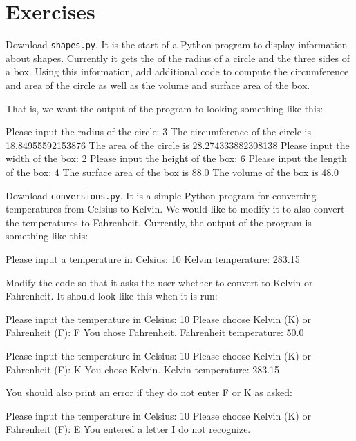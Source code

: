 \documentclass[11pt]{cselabheader}
\begin{document}
\pagebreak
\section{Exercises}

\begin{ex}[shapes.py] Download \texttt{shapes.py}. It is the start of a Python
  program to display information about shapes. Currently it gets the of the
  radius of a circle and the three sides of a box. Using this information, add
  additional code to compute the circumference and area of the circle as well as
  the volume and surface area of the box.

  That is, we want the output of the program to looking something like this:

  \begin{verbatimcode}
Please input the radius of the circle: 3
The circumference of the circle is 18.84955592153876
The area of the circle is 28.274333882308138
Please input the width of the box: 2
Please input the height of the box: 6
Please input the length of the box: 4
The surface area of the box is 88.0
The volume of the box is 48.0
  \end{verbatimcode}
\end{ex}

\begin{ex}[conversions.py] Download \texttt{conversions.py}. It is a simple
  Python program for converting temperatures from Celsius to Kelvin. We would
  like to modify it to also convert the temperatures to Fahrenheit. Currently,
  the output of the program is something like this:

  \begin{verbatimcode}
Please input a temperature in Celsius: 10
Kelvin temperature: 283.15
  \end{verbatimcode}

  Modify the code so that it asks the user whether to convert to Kelvin or
  Fahrenheit. It should look like this when it is run:

    \begin{verbatimcode}
Please input the temperature in Celsius: 10
Please choose Kelvin (K) or Fahrenheit (F): F
You chose Fahrenheit.
Fahrenheit temperature: 50.0
    \end{verbatimcode}

    \begin{verbatimcode}
Please input the temperature in Celsius: 10
Please choose Kelvin (K) or Fahrenheit (F): K
You chose Kelvin.
Kelvin temperature: 283.15
    \end{verbatimcode}
    
    You should also print an error if they do not enter F or K as asked:

    \begin{verbatimcode}
Please input the temperature in Celsius: 10
Please choose Kelvin (K) or Fahrenheit (F): E
You entered a letter I do not recognize.
    \end{verbatimcode}
\end{ex}
\end{document}
